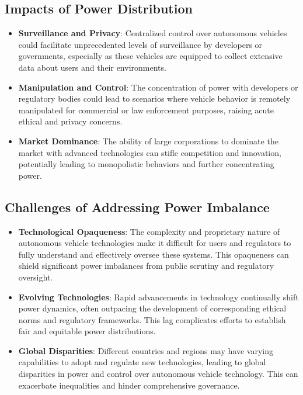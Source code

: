 \documentclass[10pt,twocolumn]{article}
\begin{document}
\subsection{Impacts of Power Distribution}
    \begin{itemize}
        \item \textbf{Surveillance and Privacy}: Centralized control over autonomous vehicles could facilitate unprecedented levels of surveillance by developers or governments, especially as these vehicles are equipped to collect extensive data about users and their environments.
        \item \textbf{Manipulation and Control}: The concentration of power with developers or regulatory bodies could lead to scenarios where vehicle behavior is remotely manipulated for commercial or law enforcement purposes, raising acute ethical and privacy concerns.
        \item \textbf{Market Dominance}: The ability of large corporations to dominate the market with advanced technologies can stifle competition and innovation, potentially leading to monopolistic behaviors and further concentrating power.
    \end{itemize}

\subsection{Challenges of Addressing Power Imbalance}
    \begin{itemize}
        \item \textbf{Technological Opaqueness}: The complexity and proprietary nature of autonomous vehicle technologies make it difficult for users and regulators to fully understand and effectively oversee these systems. This opaqueness can shield significant power imbalances from public scrutiny and regulatory oversight.
        \item \textbf{Evolving Technologies}: Rapid advancements in technology continually shift power dynamics, often outpacing the development of corresponding ethical norms and regulatory frameworks. This lag complicates efforts to establish fair and equitable power distributions.
        \item \textbf{Global Disparities}: Different countries and regions may have varying capabilities to adopt and regulate new technologies, leading to global disparities in power and control over autonomous vehicle technology. This can exacerbate inequalities and hinder comprehensive governance.
    \end{itemize}
\end{document}
